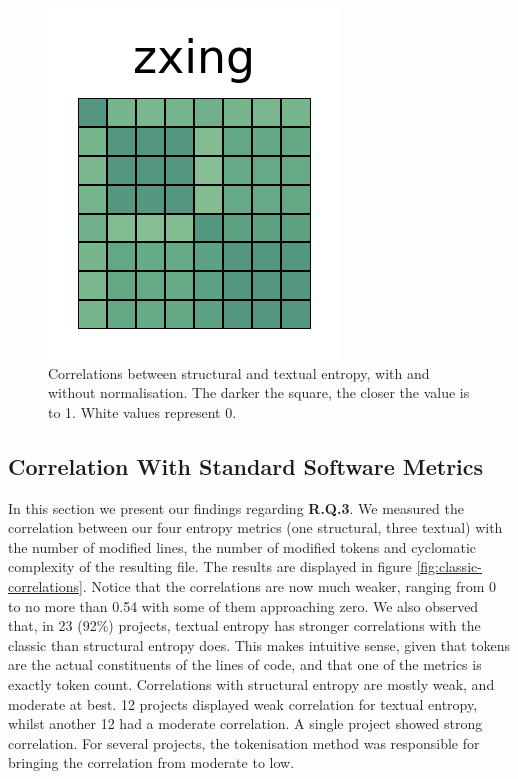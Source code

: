\documentclass[10pt,conference]{IEEEtran}
\begin{document}
\begin{figure}[htb!]
 \includegraphics[width=\heatmapWidth, keepaspectratio]{entropy-correlations/zxing-grids.png} 
\caption{Correlations between structural and textual entropy, with and without normalisation. The darker the square, the closer the value is to 1. White values represent 0.}
\label{fig:entropy-correlations}
\end{figure}

\subsection{Correlation With Standard Software Metrics}
In this section we present our findings regarding \textbf{R.Q.3}.
We measured the correlation between our four entropy metrics (one structural, three textual) with the number of modified lines, the number of modified tokens and cyclomatic complexity of the resulting file. The results are displayed in figure \ref{fig:classic-correlations}. Notice that the correlations are now much weaker, ranging from 0 to no more than 0.54 with some of them approaching zero. We also observed that, in 23 (92\%) projects, textual entropy has stronger correlations with the classic than structural entropy does. This makes intuitive sense, given that tokens are the actual constituents of the lines of code, and that one of the metrics is exactly token count. Correlations with structural entropy are mostly weak, and moderate at best. 12 projects displayed weak correlation for textual entropy, whilst another 12 had a moderate correlation. A single project showed strong correlation. For several projects, the tokenisation method was responsible for bringing the correlation from moderate to low.
\end{document}
